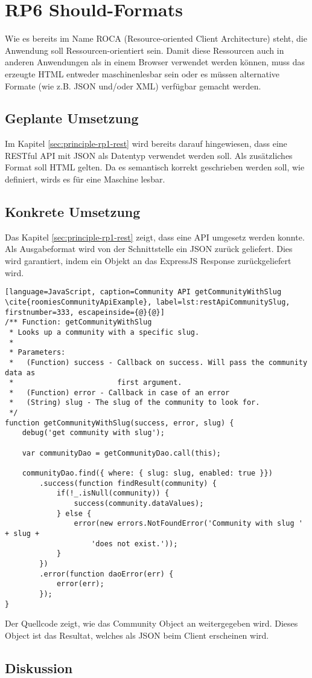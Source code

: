 \section{RP6 Should-Formats}
\label{sec:principle-rp6-should-formats}
Wie es bereits im Name ROCA (Resource-oriented Client Architecture) steht, die Anwendung soll Ressourcen-orientiert sein. Damit diese Ressourcen auch in anderen Anwendungen als in einem Browser verwendet werden können, muss das erzeugte HTML entweder maschinenlesbar sein oder es müssen alternative Formate (wie z.B. JSON und/oder XML) verfügbar gemacht werden.

\subsection*{Geplante Umsetzung}
Im Kapitel \ref{sec:principle-rp1-rest}  wird bereits darauf hingewiesen, dass eine RESTful API mit JSON als Datentyp verwendet werden soll.
Als zusätzliches Format soll HTML gelten. Da es semantisch korrekt geschrieben werden soll, wie  definiert, wirds es für eine Maschine lesbar.

\subsection*{Konkrete Umsetzung}
Das Kapitel \ref{sec:principle-rp1-rest}  zeigt, dass eine API umgesetz werden konnte.
Als Ausgabeformat wird von der Schnittstelle ein JSON zurück geliefert. Dies wird garantiert, indem ein Objekt an das ExpressJS Response \cite{ExpressjsResSend} zurückgeliefert wird.

\begin{lstlisting}[language=JavaScript, caption=Community API getCommunityWithSlug \cite{roomiesCommunityApiExample}, label=lst:restApiCommunitySlug, firstnumber=333, escapeinside={@}{@}]
/** Function: getCommunityWithSlug
 * Looks up a community with a specific slug.
 *
 * Parameters:
 *   (Function) success - Callback on success. Will pass the community data as
 *                        first argument.
 *   (Function) error - Callback in case of an error
 *   (String) slug - The slug of the community to look for.
 */
function getCommunityWithSlug(success, error, slug) {
	debug('get community with slug');

	var communityDao = getCommunityDao.call(this);

	communityDao.find({ where: { slug: slug, enabled: true }})
		.success(function findResult(community) {
			if(!_.isNull(community)) {
				success(community.dataValues);
			} else {
				error(new errors.NotFoundError('Community with slug ' + slug +
					'does not exist.'));
			}
		})
		.error(function daoError(err) {
			error(err);
		});
}
\end{lstlisting}

Der Quellcode  zeigt, wie das Community Object an weitergegeben wird. Dieses Object ist das Resultat, welches als JSON beim Client erscheinen wird.

\subsection*{Diskussion}
